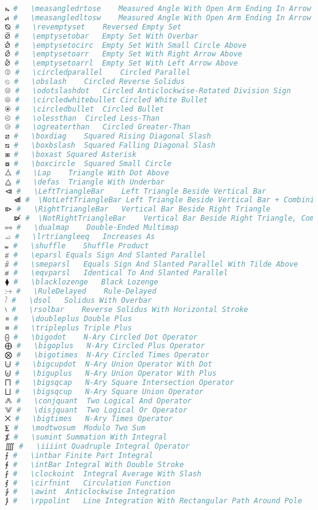\begin{lstlisting}[language=Julia, linewidth=\textwidth]
⦮ #   \measangledrtose    Measured Angle With Open Arm Ending In Arrow Right And Down
⦯ #   \measangledltosw    Measured Angle With Open Arm Ending In Arrow Left And Down
⦰ #   \revemptyset    Reversed Empty Set
⦱ #   \emptysetobar   Empty Set With Overbar
⦲ #   \emptysetocirc  Empty Set With Small Circle Above
⦳ #   \emptysetoarr   Empty Set With Right Arrow Above
⦴ #   \emptysetoarrl  Empty Set With Left Arrow Above
⦷ #   \circledparallel    Circled Parallel
⦸ #   \obslash    Circled Reverse Solidus
⦼ #   \odotslashdot   Circled Anticlockwise-Rotated Division Sign
⦾ #   \circledwhitebullet Circled White Bullet
⦿ #   \circledbullet  Circled Bullet
⧀ #   \olessthan  Circled Less-Than
⧁ #   \ogreaterthan   Circled Greater-Than
⧄ #   \boxdiag    Squared Rising Diagonal Slash
⧅ #   \boxbslash  Squared Falling Diagonal Slash
⧆ #   \boxast Squared Asterisk
⧇ #   \boxcircle  Squared Small Circle
⧊ #   \Lap    Triangle With Dot Above
⧋ #   \defas  Triangle With Underbar
⧏ #   \LeftTriangleBar    Left Triangle Beside Vertical Bar
  ⧏̸ #  \NotLeftTriangleBar Left Triangle Beside Vertical Bar + Combining Long Solidus Overlay / Non-Spacing Long Slash Overlay
⧐ #   \RightTriangleBar   Vertical Bar Beside Right Triangle
  ⧐̸ #  \NotRightTriangleBar    Vertical Bar Beside Right Triangle, Combining Long Solidus
⧟ #   \dualmap    Double-Ended Multimap
⧡ #   \lrtriangleeq   Increases As
⧢ #   \shuffle    Shuffle Product
⧣ #   \eparsl Equals Sign And Slanted Parallel
⧤ #   \smeparsl   Equals Sign And Slanted Parallel With Tilde Above
⧥ #   \eqvparsl   Identical To And Slanted Parallel
⧫ #   \blacklozenge   Black Lozenge
⧴ #   \RuleDelayed    Rule-Delayed
⧶ #   \dsol   Solidus With Overbar
⧷ #   \rsolbar    Reverse Solidus With Horizontal Stroke
⧺ #   \doubleplus Double Plus
⧻ #   \tripleplus Triple Plus
⨀ #   \bigodot    N-Ary Circled Dot Operator
⨁ #   \bigoplus   N-Ary Circled Plus Operator
⨂ #   \bigotimes  N-Ary Circled Times Operator
⨃ #   \bigcupdot  N-Ary Union Operator With Dot
⨄ #   \biguplus   N-Ary Union Operator With Plus
⨅ #   \bigsqcap   N-Ary Square Intersection Operator
⨆ #   \bigsqcup   N-Ary Square Union Operator
⨇ #   \conjquant  Two Logical And Operator
⨈ #   \disjquant  Two Logical Or Operator
⨉ #   \bigtimes   N-Ary Times Operator
⨊ #   \modtwosum  Modulo Two Sum
⨋ #   \sumint Summation With Integral
⨌ #   \iiiint Quadruple Integral Operator
⨍ #   \intbar Finite Part Integral
⨎ #   \intBar Integral With Double Stroke
⨏ #   \clockoint  Integral Average With Slash
⨐ #   \cirfnint   Circulation Function
⨑ #   \awint  Anticlockwise Integration
⨒ #   \rppolint   Line Integration With Rectangular Path Around Pole

\end{lstlisting}
